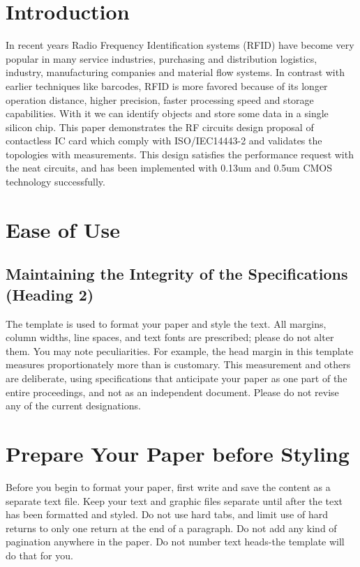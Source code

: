 \documentclass{article} %
\begin{document}
\begin{multicols}{2}



\section{ Introduction}

In recent years Radio Frequency Identification systems
(RFID) \cite{c1} have become very popular in many service industries,
purchasing and distribution logistics, industry, manufacturing
companies and material flow systems. In contrast
with earlier techniques like barcodes, RFID is more favored
because of its longer operation distance, higher precision,
faster processing speed and storage capabilities. With it we
can identify objects and store some data in a single silicon
chip. This paper demonstrates the RF circuits design proposal
of contactless IC card which comply with ISO/IEC14443-2 \cite{c2}
and validates the topologies with measurements. This design
satisfies the performance request with the neat circuits, and has
been implemented with 0.13um and 0.5um CMOS technology
successfully.

\section{ Ease of Use}


\subsection{Maintaining the Integrity of the Specifications (Heading 2)}



The template is used to format your paper and style the text. All margins, column widths, line spaces, and text fonts are prescribed; please do not alter them. You may note peculiarities. For example, the head margin in this template measures proportionately more than is customary. This measurement and others are deliberate, using specifications that anticipate your paper as one part of the entire proceedings, and not as an independent document. Please do not revise any of the current designations.


\section{Prepare Your Paper before Styling}

Before you begin to format your paper, first write and save the content as a separate text file. Keep your text and graphic files separate until after the text has been formatted and styled. Do not use hard tabs, and limit use of hard returns to only one return at the end of a paragraph. Do not add any kind of pagination anywhere in the paper. Do not number text heads-the template will do that for you.


\end{multicols}
\end{document}
